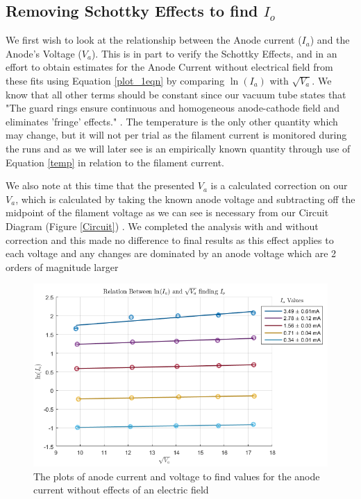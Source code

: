 \subsection{Removing Schottky Effects to find $I_o$}

We first wish to look at the relationship between the Anode current ($I_a$) and the Anode's Voltage ($V_a$). This is in part to verify the Schottky Effects, and in an effort to obtain estimates for the Anode Current without electrical field from these fits using Equation \ref{plot_1eqn} by comparing $\ln(I_a)$ with $\sqrt{V_a}$. We know that all other terms should be constant since our vacuum tube states that "The guard rings ensure continuous and homogeneous anode-cathode field and eliminates 'fringe' effects." \cite{GRD7}. The temperature is the only other quantity which may change, but it will not per trial as the filament current is monitored during the runs and as we will later see is an empirically known quantity through use of Equation \ref{temp} in relation to the filament current.

\par

We also note at this time that the presented $V_a$ is a calculated correction on our $V_a$, which is calculated by taking the known anode voltage and subtracting off the midpoint of the filament voltage as we can see is necessary from our Circuit Diagram (Figure \ref{Circuit}) \cite{LabProcedure}. We completed the analysis with and without correction and this made no difference to final results as this effect applies to each voltage and any changes are dominated by an anode voltage which are 2 orders of magnitude larger

\begin{figure}[ht!]
\includegraphics[scale=.95]{figures/plot_1_Io.png}%
\caption{The plots of anode current and voltage to find values for the anode current without effects of an electric field }%
\label{fig:plot_1}
\end{figure}

